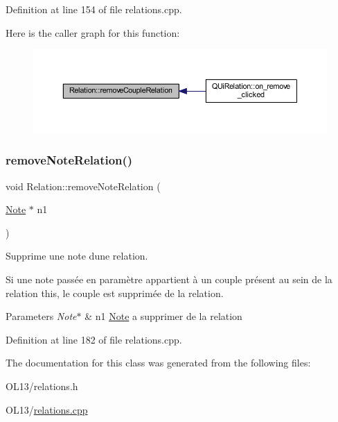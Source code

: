 Definition at line 154 of file relations.\+cpp.

Here is the caller graph for this function\+:\nopagebreak
\begin{figure}[H]
\begin{center}
\leavevmode
\includegraphics[width=350pt]{class_relation_ab81e16d688dcb4703e8ab299fef80c10_icgraph}
\end{center}
\end{figure}
\mbox{\label{class_relation_a8f25fe0ab5bf722eb08d2dd31e99c7f4}} 
\subsubsection{\texorpdfstring{remove\+Note\+Relation()}{removeNoteRelation()}}
{\footnotesize\ttfamily void Relation\+::remove\+Note\+Relation (\begin{DoxyParamCaption}\item[{\hyperlink{class_note}{Note} $\ast$}]{n1 }\end{DoxyParamCaption})}



Supprime une note d\textquotesingle{}une relation. 

Si une note passée en paramètre appartient à un couple présent au sein de la relation this, le couple est supprimée de la relation. 
\begin{DoxyParams}{Parameters}
{\em Note$\ast$} & n1 \hyperlink{class_note}{Note} a supprimer de la relation \\
\hline
\end{DoxyParams}


Definition at line 182 of file relations.\+cpp.



The documentation for this class was generated from the following files\+:\begin{DoxyCompactItemize}
\item 
O\+L13/relations.\+h\item 
O\+L13/\hyperlink{relations_8cpp}{relations.\+cpp}\end{DoxyCompactItemize}
